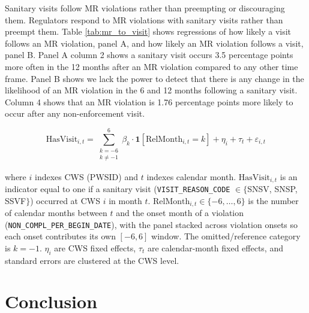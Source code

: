 \documentclass{article}
\begin{document}
Sanitary visits follow MR violations rather than preempting or discouraging them. Regulators respond to MR violations with sanitary visits rather than preempt them. Table \ref{tab:mr_to_visit} shows regressions of how likely a visit follows an MR violation, panel A, and how likely an MR violation follows a visit, panel B. Panel A column 2 shows a sanitary visit occurs 3.5 percentage points more often in the 12 months after an MR violation compared to any other time frame. Panel B shows we lack the power to detect that there is any change in the likelihood of an MR violation in the 6 and 12 months following a sanitary visit. Column 4 shows that an MR violation is 1.76 percentage points more likely to occur after any non-enforcement visit.













\begin{equation}
    \text{HasVisit}_{i,t} = \sum_{\substack{k=-6 \\ k \neq -1}}^{6} \beta_k \cdot \mathbf{1}[\text{RelMonth}_{i,t} = k] + \eta_i + \tau_t + \varepsilon_{i,t}
\end{equation}

\noindent where $i$ indexes CWS (PWSID) and $t$ indexes calendar month. $\text{HasVisit}_{i,t}$ is an indicator equal to one if a sanitary visit (\texttt{VISIT\_REASON\_CODE} $\in \{$SNSV, SNSP, SSVF$\}$) occurred at CWS $i$ in month $t$. $\text{RelMonth}_{i,t} \in \{-6, \dots, 6\}$ is the number of calendar months between $t$ and the onset month of a violation (\texttt{NON\_COMPL\_PER\_BEGIN\_DATE}), with the panel stacked across violation onsets so each onset contributes its own $[-6, 6]$ window. The omitted/reference category is $k = -1$. $\eta_i$ are CWS fixed effects, $\tau_t$ are calendar-month fixed effects, and standard errors are clustered at the CWS level.







\section{Conclusion}
\end{document}
